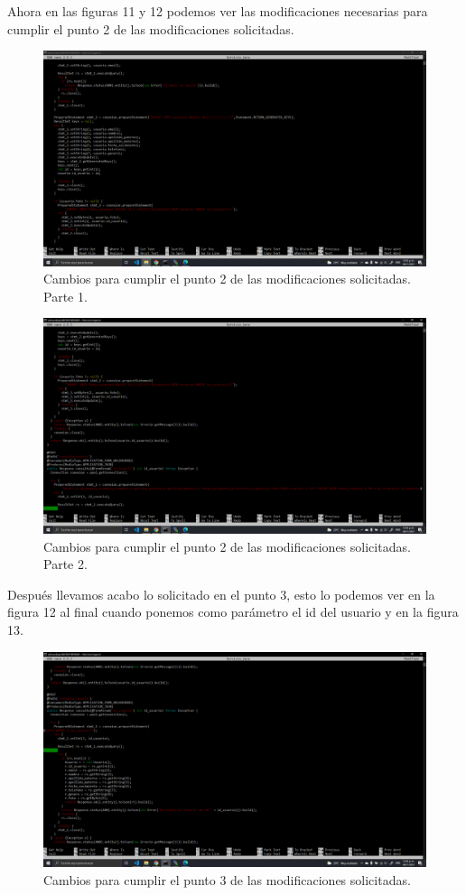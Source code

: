 \documentclass[11pt]{article}
\begin{document}
		Ahora en las figuras 11 y 12 podemos ver las modificaciones necesarias para cumplir el punto 2 de las modificaciones solicitadas.
		\begin{figure}[H]
			\centering
			\includegraphics[scale=0.34]{resources/p2.png}
			\caption{Cambios para cumplir el punto 2 de las modificaciones solicitadas. Parte 1.}	\label{fig:picture}
		\end{figure}
		\begin{figure}[H]
			\centering
			\includegraphics[scale=0.34]{resources/p2.1p3.png}
			\caption{Cambios para cumplir el punto 2 de las modificaciones solicitadas. Parte 2.}	\label{fig:picture}
		\end{figure}
		Después llevamos acabo lo solicitado en el punto 3, esto lo podemos ver en la figura 12 al final cuando ponemos como parámetro el id del usuario y en la figura 13.
		\begin{figure}[H]
			\centering
			\includegraphics[scale=0.34]{resources/p3.1.png}
			\caption{Cambios para cumplir el punto 3 de las modificaciones solicitadas.}\label{fig:picture}
		\end{figure}
\end{document}
